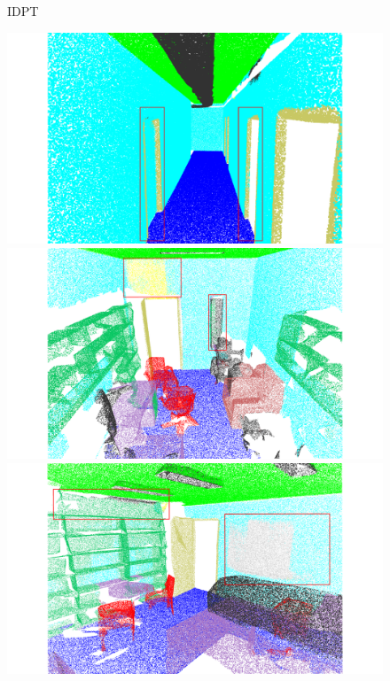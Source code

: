 \begin{figure}[htbp]
    \begin{minipage}{0.1\textwidth}
        \centering
        IDPT
    \end{minipage}
    \hfill
    \begin{minipage}{0.22\textwidth}
        \centering
        \includegraphics[width=\textwidth]{fig/supplement/semantic_segmentation/hallway_10/IDPT_hallway_10.pdf}
    \end{minipage}
    \hfill
    \begin{minipage}{0.22\textwidth}
        \centering
        \includegraphics[width=\textwidth]{fig/supplement/semantic_segmentation/office_9/IDPT_office_9.pdf}
    \end{minipage}
    \hfill
    \begin{minipage}{0.22\textwidth}
        \centering
        \includegraphics[width=\textwidth]{fig/supplement/semantic_segmentation/office_35/IDPT_office_35.pdf}

\end{minipage}
\end{figure}
